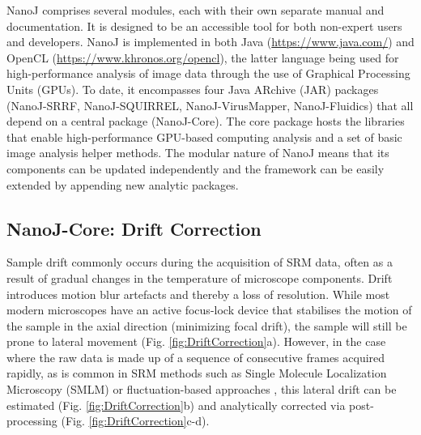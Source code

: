  NanoJ comprises several modules, each with their own separate manual and documentation. It is designed to be an accessible tool for both non-expert users and developers. NanoJ is implemented in both Java (\href{https://www.java.com/}{https://www.java.com/}) and OpenCL (\href{https://www.khronos.org/opencl}{https://www.khronos.org/opencl}), the latter language being used for high-performance analysis of image data through the use of Graphical Processing Units (GPUs). To date, it encompasses four Java ARchive (JAR) packages (NanoJ-SRRF, NanoJ-SQUIRREL, NanoJ-VirusMapper, NanoJ-Fluidics) that all depend on a central package (NanoJ-Core). The core package hosts the libraries that enable high-performance GPU-based computing analysis and a set of basic image analysis helper methods. The modular nature of NanoJ means that its components can be updated independently and the framework can be easily extended by appending new analytic packages.

\subsection*{NanoJ-Core: Drift Correction}
Sample drift commonly occurs during the acquisition of SRM data, often as a result of gradual changes in the temperature of microscope components. Drift introduces motion blur artefacts and thereby a loss of resolution. While most modern microscopes have an active focus-lock device that stabilises the motion of the sample in the axial direction (minimizing focal drift), the sample will still be prone to lateral movement (Fig. \ref{fig:DriftCorrection}a). However, in the case where the raw data is made up of a sequence of consecutive frames acquired rapidly, as is common in SRM methods such as Single Molecule Localization Microscopy (SMLM) \cite{betzig2006imaging,rust2006sub} or fluctuation-based approaches \cite{gustafsson2016fast,dertinger2009fast,cox2012bayesian}, this lateral drift can be estimated (Fig. \ref{fig:DriftCorrection}b) and analytically corrected via post-processing (Fig. \ref{fig:DriftCorrection}c-d).
 
